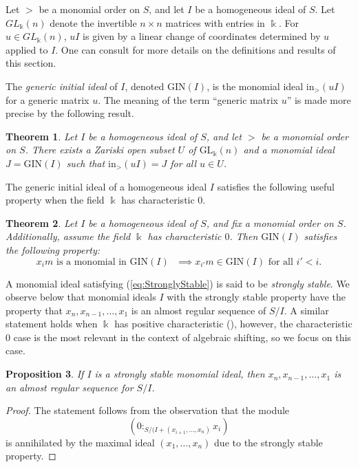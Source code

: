 \documentclass[a4paper, 10pt, reqno, english, ones]{amsart}  %
\newtheorem{theorem}{Theorem}[section]
\newtheorem{proposition}[theorem]{Proposition}
\theoremstyle{definition}
\theoremstyle{remark}
\begin{document}
Let $>$ be a monomial order on $S$, and let $I$ be a homogeneous ideal of $S$. Let $GL_\Bbbk (n)$ denote the invertible $n\times n$ matrices with entries in $\Bbbk $. For $u\in GL_\Bbbk (n)$, $uI$ is given by a linear change of coordinates determined by $u$ applied to $I$. One can consult \cite[Chapter 15]{eisenbudBook} for more details on the definitions and results of this section.

The \textit{generic initial ideal} of $I$, denoted $\textrm{GIN}(I)$, is the monomial ideal $\textrm{in}_>(uI)$ for a generic matrix $u$. The meaning of the term ``generic matrix $u$'' is made more precise by the following result.

\begin{theorem}\label{thm:GIN Open}
    Let $I$ be a homogeneous ideal of $S$, and let $>$ be a monomial order on $S$. There exists a Zariski open subset $U$ of $\textrm{GL}_\Bbbk (n)$ and a monomial ideal $J=\textrm{GIN}(I)$ such that $\textrm{in}_>(uI)=J$ for all $u\in U$.
\end{theorem}

The generic initial ideal of a homogeneous ideal $I$ satisfies the following useful property when the field $\Bbbk $ has characteristic $0$.

\begin{theorem}\label{thm:GIN StronglyStable}
    Let $I$ be a homogeneous ideal of $S$, and fix a monomial order on $S$. Additionally, assume the field $\Bbbk $ has characteristic $0$. Then $\textrm{GIN}(I)$ satisfies the following property:
    \begin{equation}\label{eq:StronglyStable}
        x_im \textrm{ is a monomial in $\textrm{GIN}(I)$ }\implies x_{i'}m\in \textrm{GIN}(I) \textrm{ for all $i'<i$}.
    \end{equation}
\end{theorem}

A monomial ideal satisfying (\ref{eq:StronglyStable}) is said to be \textit{strongly stable}. We observe below that monomial ideals $I$ with the strongly stable property have the property that $x_n,x_{n-1},\dots,x_1$ is an almost regular sequence of $S/I$. A similar statement holds when $\Bbbk$ has positive characteristic (\cite[Chapter 15]{eisenbudBook}), however, the characteristic $0$ case is the most relevant in the context of algebraic shifting, so we focus on this case.

\begin{proposition}\label{prop:SS AlmostReg}
    If $I$ is a strongly stable monomial ideal, then $x_n,x_{n-1},\dots,x_1$ is an almost regular sequence for $S/I$.
\end{proposition}
\begin{proof}
    The statement follows from the observation that the module 
    \[
    (0:_{S/(I+ (x_{i+1},\dots,x_n)} x_i)
    \]
    is annihilated by the maximal ideal $(x_1,\dots,x_n)$ due to the strongly stable property.
\end{proof}
\end{document}
